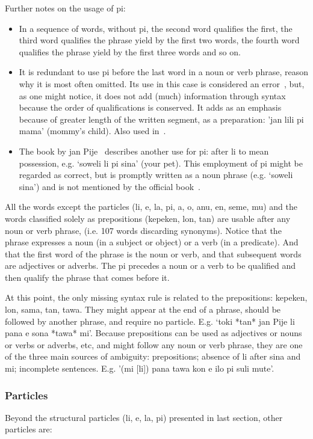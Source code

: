 \noindent Further notes on the usage of pi:
\begin{itemize}
  \item In a sequence of words, without pi, the second word qualifies
    the first, the third word qualifies the phrase yield by the first
    two words, the fourth word qualifies the phrase yield by the first
    three words and so on.
  \item It is redundant to use pi before the last word in a noun or
    verb phrase, reason why it is most often
    omitted.
    Its use in this case is considered an error~\cite{tpLang,kama},
    but, as one might notice, it does not add (much) information
    through syntax because the order of qualifications is conserved.
    It adds as an emphasis because of greater length of the written segment, as a preparation: 'jan lili pi mama' (mommy's child).
    Also used in~\cite{akesiWawa}.
  \item The book by jan Pije~\cite{kama} describes another use for pi:
    after li to mean possession, e.g. `soweli li pi sina' (your pet).
    This employment of pi might be regarded as correct, but is promptly written
    as a noun phrase (e.g. `soweli sina') and is not mentioned
    by the official book~\cite{tpLang}.
\end{itemize}

All the words except the particles (li, e, la, pi, a, o, anu, en, seme, mu)
and the words classified solely as
prepositions (kepeken, lon, tan)
are usable after any noun or verb phrase,
(i.e. 107 words discarding synonyms).
Notice that the phrase expresses a noun (in a subject or
object) or a verb (in a predicate).
And that the first word of the phrase is the noun or verb,
and that subsequent words are adjectives or adverbs.
The pi precedes a noun or a verb to be qualified and then qualify
the phrase that comes before it.

At this point, the only missing syntax rule is related to
the prepositions: kepeken, lon, sama, tan, tawa.
They might appear at the end of a phrase,
should be followed by another phrase,
and require no particle. E.g.
`toki *tan* jan Pije li pana e sona *tawa* mi'.
Because prepositions can be used as adjectives
or nouns or verbs or adverbs, etc, and might follow
any noun or verb phrase,
they are one of the three main sources of ambiguity:
prepositions; absence of li after sina and mi; incomplete sentences.
E.g. '(mi [li]) pana tawa kon e ilo pi suli mute'.

\subsubsection{Particles}\label{sec:par}
Beyond the structural particles (li, e, la, pi) presented
in last section, other particles are:

